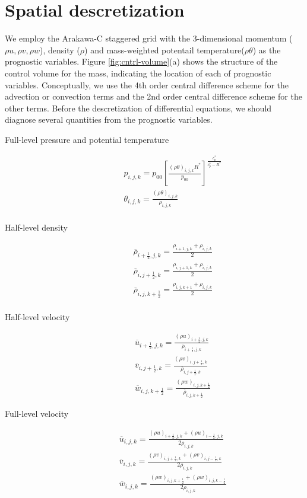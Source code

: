 \section{Spatial descretization}
We employ the Arakawa-C staggered grid with the 3-dimensional momentum 
($\rho u, \rho v, \rho w$), density ($\rho$) and mass-weighted potentail temperature($\rho \theta$)
as the prognostic variables.
Figure \ref{fig:cntrl-volume}(a) shows the structure of the control volume for the mass,
indicating the location of each of prognostic variables.
Conceptually, we use the 4th order central difference scheme 
for the advection or convection terms and
the 2nd order central difference scheme for the other terms.
Before the descretization of differential equations,
we should diagnose several quantities from the prognostic variables.
\begin{description}
\item[Full-level pressure and potential temperature]
\begin{eqnarray}
&&p_{i,j,k}=p_{00}\left[\frac{(\rho \theta)_{i,j,k} R^*}{p_{00}} \right]^{\frac{c_{p}^*}{c_{p}^*- R^*}}\\
&&\theta_{i,j,k} = \frac{(\rho \theta)_{i,j,k}}{\rho_{i,j,k}}\\
\end{eqnarray}
\item[Half-level density]
\begin{eqnarray}
&&  \overline{\rho}_{i+\frac{1}{2},j,k} = \frac{\rho_{i+1,j,k}+\rho_{i,j,k}}{2}\\
&&  \overline{\rho}_{i,j+\frac{1}{2},k} = \frac{\rho_{i,j+1,k}+\rho_{i,j,k}}{2}\\
&&  \overline{\rho}_{i,j,k+\frac{1}{2}} = \frac{\rho_{i,j,k+1}+\rho_{i,j,k}}{2}\\
\end{eqnarray}
\item[Half-level velocity]
\begin{eqnarray}
&&  \overline{u}_{i+\frac{1}{2},j,k} = \frac{(\rho u)_{i+\frac{1}{2},j,k}}{\overline{\rho}_{i+\frac{1}{2},j,k}}\\
&&  \overline{v}_{i,j+\frac{1}{2},k} = \frac{(\rho v)_{i,j+\frac{1}{2},k}}{\overline{\rho}_{i,j+\frac{1}{2},k}}\\
&&  \overline{w}_{i,j,k+\frac{1}{2}} = \frac{(\rho w)_{i,j,k+\frac{1}{2}}}{\overline{\rho}_{i,j,k+\frac{1}{2}}}
\end{eqnarray}
\item[Full-level velocity]
\begin{eqnarray}
&&  \overline{u}_{i,j,k} = \frac{(\rho u)_{i+\frac{1}{2},j,k}+(\rho u)_{i-\frac{1}{2},j,k}}{2\rho_{i,j,k}}\\
&&  \overline{v}_{i,j,k} = \frac{(\rho v)_{i,j+\frac{1}{2},k}+(\rho v)_{i,j-\frac{1}{2},k}}{2\rho_{i,j,k}}\\
&&  \overline{w}_{i,j,k} = \frac{(\rho w)_{i,j,k+\frac{1}{2}}+(\rho w)_{i,j,k-\frac{1}{2}}}{2\rho_{i,j,k}}
\end{eqnarray}
\end{description}




